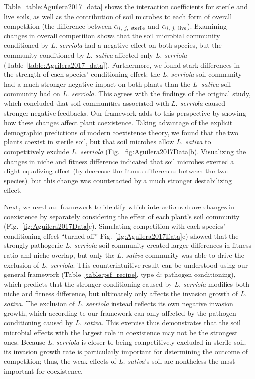 Table~\ref{table:Aguilera2017_data} shows the interaction coefficients for sterile and live soils, as well as the contribution of soil microbes to each form of overall competition (the difference between $\alpha_{i,\ j,\ \textup{sterile}}$ and $\alpha_{i,\ j,\ \textup{live}}$).
Examining changes in overall competition shows that the soil microbial community conditioned by \textit{L. serriola} had a negative effect on both species, but the community conditioned by \textit{L. sativa} affected only \textit{L. serriola} (Table~\ref{table:Aguilera2017_data}). Furthermore, we found stark differences in the strength of each species' conditioning effect: the \textit{L. serriola} soil community had a much stronger negative impact on both plants than the \textit{L. sativa} soil community had on \textit{L. serriola}. This agrees with the findings of the original study, which concluded that soil communities associated with \textit{L. serriola} caused stronger negative feedbacks.
Our framework adds to this perspective by showing how these changes affect plant coexistence. Taking advantage of the explicit demographic predictions of modern coexistence theory, we found that the two plants coexist in sterile soil, but that soil microbes allow \textit{L. sativa} to competitively exclude \textit{L. serriola} (Fig.~\ref{fig:Aguilera2017Data}b). Visualizing the changes in niche and fitness difference indicated that soil microbes exerted a slight equalizing effect (by decrease the fitness differences between the two species), but this change was counteracted by a much stronger destabilizing effect.
\par


Next, we used our framework to identify which interactions drove changes in coexistence by separately considering the effect of each plant's soil community (Fig.~\ref{fig:Aguilera2017Data}c). Simulating competition with each species' conditioning effect ``turned off'' Fig.~\ref{fig:Aguilera2017Data}c) showed that the strongly pathogenic \textit{L. serriola} soil community created larger differences in fitness ratio and niche overlap, but only the \textit{L. sativa} community was able to drive the exclusion of \textit{L. serriola}.
This counterintuitive result can be understood using our general framework (Table~\ref{table:psf_recipe}, type d: pathogen conditioning), which predicts that the stronger conditioning caused by \textit{L. serriola} modifies both niche and fitness difference, but ultimately only affects the invasion growth of \textit{L. sativa}. The exclusion of \textit{L. serriola} instead reflects its own negative invasion growth, which according to our framework can only affected by the pathogen conditioning caused by \textit{L. sativa}.
This exercise thus demonstrates that the soil microbial effects with the largest role in coexistence may not be the strongest ones.
Because \textit{L. serriola} is closer to being competitively excluded in sterile soil, its invasion growth rate is particularly important for determining the outcome of competition; thus, the weak effects of \textit{L. sativa}'s soil are nontheless the most important for coexistence.
\par


